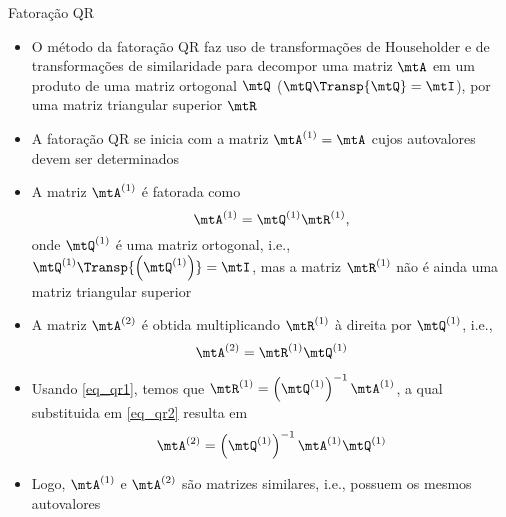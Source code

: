 \begin{frame}{Fatoração QR~\cite[cap. 4]{Gilat2008}}
  \footnotesize
  \begin{itemize}
    \item O método da fatoração QR faz uso de {\alert{transformações de Householder}} e de {\alert{transformações de similaridade}} para decompor uma matriz $\mtA$ em um produto de uma matriz ortogonal $\mtQ$ ($\mtQ\Transp{\mtQ} = \mtI$), por uma matriz triangular superior $\mtR$
    \item A fatoração QR se inicia com a matriz $\mtA^{(1)} = \mtA$ cujos autovalores devem ser determinados
    \item A matriz $\mtA^{(1)}$ é fatorada como
    \begin{equation}\label{eq_qr1}
      \mtA^{(1)} = \mtQ^{(1)}\mtR^{(1)},
    \end{equation}
    onde $\mtQ^{(1)}$ é uma matriz ortogonal, i.e., $\mtQ^{(1)}\Transp{\left(\mtQ^{(1)}\right)} = \mtI$, mas a matriz $\mtR^{(1)}$ não é ainda uma matriz triangular superior
    \item A matriz $\mtA^{(2)}$ é obtida multiplicando $\mtR^{(1)}$ à direita por $\mtQ^{(1)}$, i.e.,
    \begin{equation}\label{eq_qr2}
      \mtA^{(2)} = \mtR^{(1)}\mtQ^{(1)}
    \end{equation}
    \item Usando \eqref{eq_qr1}, temos que $\mtR^{(1)} = \left(\mtQ^{(1)}\right)^{-1}\mtA^{(1)}$, a qual substituida em \eqref{eq_qr2} resulta em
    \begin{equation}
      \mtA^{(2)} = \left(\mtQ^{(1)}\right)^{-1}\mtA^{(1)}\mtQ^{(1)}
    \end{equation}
    \item Logo, $\mtA^{(1)}$ e $\mtA^{(2)}$ são matrizes similares, i.e., possuem os mesmos autovalores
  \end{itemize}
\end{frame}

